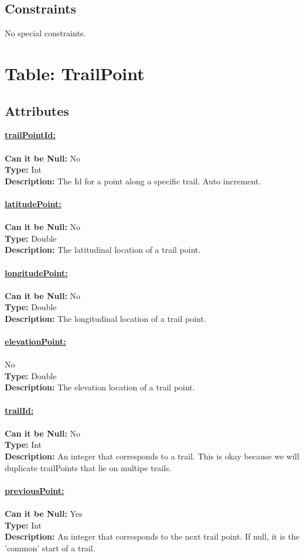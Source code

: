 \subsection{Constraints}
No special constraints.



\newpage
\section{Table: TrailPoint}
\subsection{Attributes}
\textbf{\underline{trailPointId:}}\\
\\
\textbf{Can it be Null:} No\\
\textbf{Type:} Int\\
\textbf{Description:}
The Id for a point along a specific trail. Auto increment.\\\\
\textbf{\underline{latitudePoint:}}\\
\\
\textbf{Can it be Null:} No\\
\textbf{Type:} Double\\
\textbf{Description:}
The latitudinal location of a trail point. \\\\
\textbf{\underline{longitudePoint:}}\\
\\
\textbf{Can it be Null:} No\\
\textbf{Type:} Double\\
\textbf{Description:}
The longitudinal location of a trail point.\\\\
\textbf{\underline{elevationPoint:}}\\
\\
 No\\
\textbf{Type:} Double\\
\textbf{Description:}
The elevation location of a trail point.\\\\
\textbf{\underline{trailId:}}\\%
\\
\textbf{Can it be Null:} No\\
\textbf{Type:} Int\\
\textbf{Description:}
An integer that corresponds to a trail. This is okay because we will 
duplicate trailPoints that lie on multipe trails.\\\\
\textbf{\underline{previousPoint:}}\\
\\
\textbf{Can it be Null:} Yes\\
\textbf{Type:} Int\\
\textbf{Description:}
An integer that corresponds to the next trail point. If null, it is the 'common' start of a trail.\\\\
